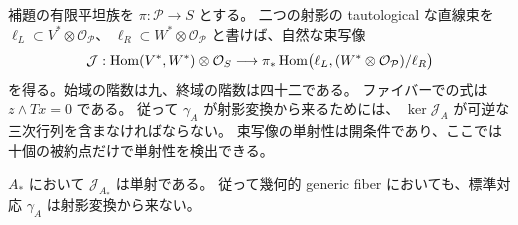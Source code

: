 補題の有限平坦族を $\pi:\mathcal P\to S$ とする。
二つの射影の tautological な直線束を
$\ell_L\subset V^*\otimes\mathcal O_{\mathcal P}$、
$\ell_R\subset W^*\otimes\mathcal O_{\mathcal P}$ と書けば、自然な束写像
\begin{equation}\label{eq:matching-projectivity-map-v23}
 \mathcal J:\operatorname{Hom}(V^*,W^*)\otimes\mathcal O_S
 \longrightarrow
 \pi_*\operatorname{Hom}\bigl(\ell_L,(W^*\otimes\mathcal O_{\mathcal P})/\ell_R\bigr)
\end{equation}
を得る。始域の階数は九、終域の階数は四十二である。
ファイバーでの式は $z\wedge Tx=0$ である。
従って $\gamma_A$ が射影変換から来るためには、
$\ker\mathcal J_A$ が可逆な三次行列を含まなければならない。
束写像の単射性は開条件であり、ここでは十個の被約点だけで単射性を検出できる。

\begin{proposition}[明示点の対応は射影変換でない]
\label{prop:rank-nine-matching-v23}
$A_*$ において $\mathcal J_{A_*}$ は単射である。
従って幾何的 generic fiber においても、標準対応 $\gamma_A$ は射影変換から来ない。
\end{proposition}
